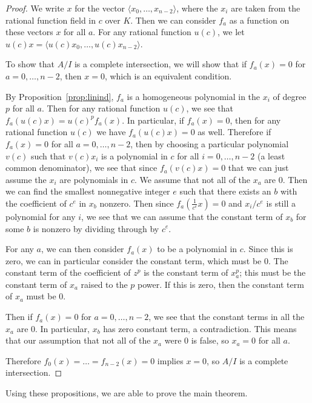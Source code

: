 \documentclass{article}
\numberwithin{equation}{section}
\begin{document}
\begin{proof} 

We write $x$ for the vector $\langle x_0,\dots, x_{n-2} \rangle$, where the $x_i$ are taken from the rational function field in $c$ over $K$. Then we can consider $f_a$ as a function on these vectors $x$ for all $a$. For any rational function $u( c)$, we let $u(c )x=\langle u(c )x_0,\dots, u(c )x_{n-2}\rangle$. 

To show that $A/I$ is a complete intersection, we will show that if $f_a(x)=0$ for $a=0,\dots,n-2$, then $x=0$, which is an equivalent condition. 

By Proposition~\ref{prop:linind}, $f_a$ is a homogeneous polynomial in the $x_i$ of degree $p$ for all $a$. Then for any rational function $u(c )$, we see that $f_a(u(c )x)=u(c )^pf_a(x)$. In particular, if $f_a(x)=0$, then for any rational function $u(c )$ we have $f_a(u(c )x)=0$ as well. Therefore if $f_a(x) = 0$ for all $a=0,\dots,n-2$, then by choosing a particular polynomial $v(c )$ such that $v(c )x_i$ is a polynomial in $c$ for all $i=0,\dots,n-2$ (a least common denominator), we see that since $f_a(v(c )x)=0$ that we can just assume the $x_i$ are polynomials in $c$. We assume that not all of the $x_a$ are $0$. Then we can find the smallest nonnegative integer $e$ such that there exists an $b$ with the coefficient of $c^e$ in $x_b$ nonzero. Then since $f_a(\frac{1}{c^e}x)=0$ and $x_i/c^e$ is still a polynomial for any $i$, we see that we can assume that the constant term of $x_b$ for some $b$ is nonzero by dividing through by $c^e$. 

For any $a$, we can then consider $f_a(x)$ to be a polynomial in $c$. Since this is zero, we can in particular consider the constant term, which must be $0$. The constant term of the coefficient of $z^p$ is the constant term of $x_a^p$; this must be the constant term of $x_a$ raised to the $p$ power. If this is zero, then the constant term of $x_a$ must be $0$. 

Then if $f_a(x) =0$ for $a=0,\dots,n-2$, we see that the constant terms in all the $x_a$ are $0$. In particular, $x_b$ has zero constant term, a contradiction. This means that our assumption that not all of the $x_a$ were $0$ is false, so $x_a=0$ for all $a$. 

Therefore $f_0(x) = \dots = f_{n-2}(x)=0$ implies $x=0$, so $A/I$ is a complete intersection.
\end{proof}

Using these propositions, we are able to prove the main theorem.
\end{document}
